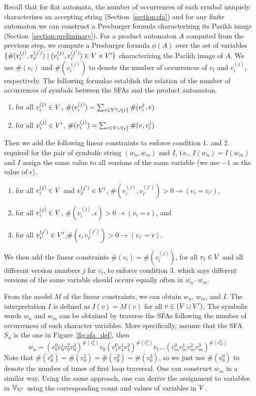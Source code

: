 \documentclass[sigplan,review,anonymous]{acmart}\settopmatter{printfolios=true,printccs=false,printacmref=false}
\begin{document}
Recall that for flat automata, the number of occurrences of each symbol uniquely characterizes an accepting string (Section~\ref{section:sfa}) and for any finite automaton we can construct a Presburger formula characterizing its Parikh image (Section~\ref{section:preliminary}). For a product automaton $A$ computed from the previous step, we compute a Presburger formula $\phi(A)$ over the set of variables $\{\#{(v_i^{(j)},v_{i'}^{(j')})}\mid (v_i^{(j)},v_{i'}^{(j')}) \in V \times V'\}$ characterizing the Parikh image of $A$. We use $\#(v_i)$ and $\#(v_i^{(j)})$ to denote the number of occurrences of $v_i$ and $v_i^{(j)}$, respectively. The following formulae establish the relation of the number of occurrences of symbols between the SFAs and the product automaton.
\begin{enumerate}
	\item for all $v_i^{(j)} \in V$, $\#(v_i^{(j)}) = \sum_{v \in {V'\cup \{\epsilon\}}} \#{(v_i^{j},v)}$   
	\item for all $v_i^{(j)} \in V'$, $\#(v_i^{(j)}) = \sum_{v \in {V\cup \{\epsilon\}}} \#{(v,v_i^{j})}$ 
\end{enumerate}

Then we add the following linear constraints to enforce  condition 1. and 2. required for the pair of symbolic string $(w_n, w_m)$ and $I$, i.e., $I(w_n) = I(w_m)$ and $I$ assign the same value to all versions of the same variable (we use $-1$ as the value of $\epsilon$). 
\begin{enumerate}
	\item for all $v_i^{(j)}\in V$ and $v_{i'}^{(j')}\in V'$, $\#{(v_i^{(j)},v_{i'}^{(j')})}>0 \rightarrow (v_i=v_{i'})$, 
	\item for all $v_i^{(j)}\in V$, $\#{(v_i^{(j)},\epsilon)}>0 \rightarrow (v_i=\epsilon)$, and
	\item for all $v_{i'}^{(j')}\in V'$,$\#{(\epsilon,v_{i'}^{(j')})}>0 \rightarrow (v_{i'}=\epsilon)$.
\end{enumerate}
We then add the linear constraints $\#(v_i) = \#(v_i^{(j)})$, for all $v_i\in V$ and all different version numbers $j$ for $v_i$, to enforce condition 3, which says different versions of the same variable should occurs equally often in $w_n\cdot w_m$. 

From the model $M$ of the linear constraints, we can obtain $w_n$, $w_m$, and $I$. The interpretation $I$ is defined as $I(v)=M(v)$ for all $v\in (V \cup V')$. The symbolic words $w_n$ and $w_m$ can be obtained by traverse the SFAs following the number of occurrences of each character variables.
More specifically, assume that the SFA $S_n$ is the one in Figure~\ref{fig:sfa_def}, then $$w_n = (v_0^0v_0^1v_0^2v_0^3)^{\#(v_0^0)}v_0(v_1^0v_1^1v_1^2)^{\#(v_1^0)}v_1\ldots(v_m^0v_m^1v_m^2v_m^3)^{\#(v_m^0)}$$
Note that $\#(v_0^0)=\#(v_0^1)=\#(v_0^2)=\#(v_0^3)$, so we just use $\#(v_0^0)$ to denote the number of times of first loop traversal. One can construct $w_m$ in a similar way. Using the same approach, one can derive the assignment to variables in $\mbox{$\mathbb{V}_{\Sigma^*}$}$ using the corresponding count and values of variables in $V$.
\end{document}
